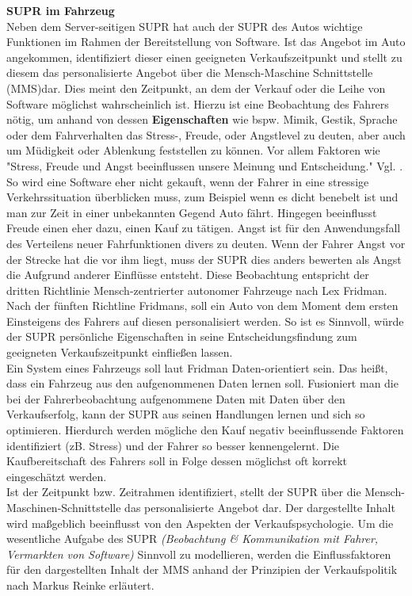 \textbf{SUPR im Fahrzeug}\\
Neben dem Server-seitigen SUPR hat auch der SUPR des Autos wichtige Funktionen im Rahmen der Bereitstellung von Software. 
Ist das Angebot im Auto angekommen, identifiziert dieser einen geeigneten Verkaufszeitpunkt und stellt zu diesem das personalisierte Angebot über die Mensch-Maschine Schnittstelle (MMS)dar. Dies meint den Zeitpunkt, an dem der Verkauf oder die Leihe von Software möglichst wahrscheinlich ist. Hierzu ist eine Beobachtung des Fahrers nötig, um anhand von dessen \textbf{Eigenschaften} wie bspw. Mimik, Gestik, Sprache oder dem Fahrverhalten das Stress-, Freude, oder Angstlevel zu deuten, aber auch um Müdigkeit oder Ablenkung feststellen zu können. Vor allem Faktoren wie "Stress, Freude und Angst beeinflussen unsere Meinung und Entscheidung." Vgl. \cite[S.44]{Spindler2016}.
So wird eine Software eher nicht gekauft, wenn der Fahrer in eine stressige Verkehrssituation überblicken muss, zum Beispiel wenn es dicht benebelt ist und man zur Zeit in einer unbekannten Gegend Auto fährt. Hingegen beeinflusst Freude einen eher dazu, einen Kauf zu tätigen. Angst ist für den Anwendungsfall des Verteilens neuer Fahrfunktionen divers zu deuten. Wenn der Fahrer Angst vor der Strecke hat die vor ihm liegt, muss der SUPR dies anders bewerten als Angst die Aufgrund anderer Einflüsse entsteht. Diese Beobachtung entspricht der dritten Richtlinie Mensch-zentrierter autonomer Fahrzeuge nach Lex Fridman. \cite[S. 3]{b5} Nach der fünften Richtline Fridmans, soll ein Auto von dem Moment dem ersten Einsteigens des Fahrers auf diesen personalisiert werden.\cite[S. 5]{b5} So ist es Sinnvoll, würde der SUPR persönliche Eigenschaften in seine Entscheidungsfindung zum geeigneten Verkaufszeitpunkt einfließen lassen. \\

Ein System eines Fahrzeugs soll laut Fridman Daten-orientiert sein\cite[S. 3]{b5}. Das heißt, dass ein Fahrzeug aus den aufgenommenen Daten lernen soll. Fusioniert man die bei der Fahrerbeobachtung aufgenommene Daten mit Daten über den Verkaufserfolg, kann der SUPR aus seinen Handlungen lernen und sich so optimieren. Hierdurch werden mögliche den Kauf negativ beeinflussende Faktoren identifiziert (zB. Stress) und der Fahrer so besser kennengelernt. Die Kaufbereitschaft des Fahrers soll in Folge dessen möglichst oft korrekt eingeschätzt werden.\\

Ist der Zeitpunkt bzw. Zeitrahmen identifiziert, stellt der SUPR über die Mensch-Maschinen-Schnittstelle das personalisierte Angebot dar. Der dargestellte Inhalt wird maßgeblich beeinflusst von den Aspekten der Verkaufspsychologie. Um die wesentliche Aufgabe des SUPR \textit{(Beobachtung \& Kommunikation mit Fahrer, Vermarkten von Software)} Sinnvoll zu modellieren, werden die Einflussfaktoren für den dargestellten Inhalt der MMS anhand der Prinzipien der Verkaufspolitik nach Markus Reinke \cite{vkPsy} erläutert.\\

